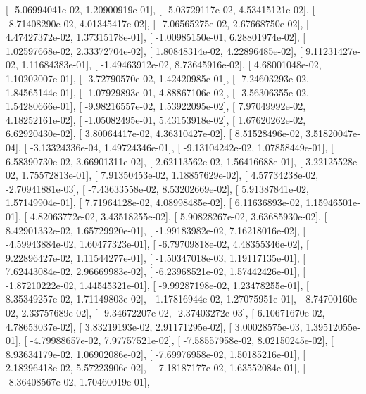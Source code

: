 \documentclass{article}
\begin{document}
       [ -5.06994041e-02,   1.20900919e-01],
       [ -5.03729117e-02,   4.53415121e-02],
       [ -8.71408290e-02,   4.01345417e-02],
       [ -7.06565275e-02,   2.67668750e-02],
       [  4.47427372e-02,   1.37315178e-01],
       [ -1.00985150e-01,   6.28801974e-02],
       [  1.02597668e-02,   2.33372704e-02],
       [  1.80848314e-02,   4.22896485e-02],
       [  9.11231427e-02,   1.11684383e-01],
       [ -1.49463912e-02,   8.73645916e-02],
       [  4.68001048e-02,   1.10202007e-01],
       [ -3.72790570e-02,   1.42420985e-01],
       [ -7.24603293e-02,   1.84565144e-01],
       [ -1.07929893e-01,   4.88867106e-02],
       [ -3.56306355e-02,   1.54280666e-01],
       [ -9.98216557e-02,   1.53922095e-02],
       [  7.97049992e-02,   4.18252161e-02],
       [ -1.05082495e-01,   5.43153918e-02],
       [  1.67620262e-02,   6.62920430e-02],
       [  3.80064417e-02,   4.36310427e-02],
       [  8.51528496e-02,   3.51820047e-04],
       [ -3.13324336e-04,   1.49724346e-01],
       [ -9.13104242e-02,   1.07858449e-01],
       [  6.58390730e-02,   3.66901311e-02],
       [  2.62113562e-02,   1.56416688e-01],
       [  3.22125528e-02,   1.75572813e-01],
       [  7.91350453e-02,   1.18857629e-02],
       [  4.57734238e-02,  -2.70941881e-03],
       [ -7.43633558e-02,   8.53202669e-02],
       [  5.91387841e-02,   1.57149904e-01],
       [  7.71964128e-02,   4.08998485e-02],
       [  6.11636893e-02,   1.15946501e-01],
       [  4.82063772e-02,   3.43518255e-02],
       [  5.90828267e-02,   3.63685930e-02],
       [  8.42901332e-02,   1.65729920e-01],
       [ -1.99183982e-02,   7.16218016e-02],
       [ -4.59943884e-02,   1.60477323e-01],
       [ -6.79709818e-02,   4.48355346e-02],
       [  9.22896427e-02,   1.11544277e-01],
       [ -1.50347018e-03,   1.19117135e-01],
       [  7.62443084e-02,   2.96669983e-02],
       [ -6.23968521e-02,   1.57442426e-01],
       [ -1.87210222e-02,   1.44545321e-01],
       [ -9.99287198e-02,   1.23478255e-01],
       [  8.35349257e-02,   1.71149803e-02],
       [  1.17816944e-02,   1.27075951e-01],
       [  8.74700160e-02,   2.33757689e-02],
       [ -9.34672207e-02,  -2.37403272e-03],
       [  6.10671670e-02,   4.78653037e-02],
       [  3.83219193e-02,   2.91171295e-02],
       [  3.00028575e-03,   1.39512055e-01],
       [ -4.79988657e-02,   7.97757521e-02],
       [ -7.58557958e-02,   8.02150245e-02],
       [  8.93634179e-02,   1.06902086e-02],
       [ -7.69976958e-02,   1.50185216e-01],
       [  2.18296418e-02,   5.57223906e-02],
       [ -7.18187177e-02,   1.63552084e-01],
       [ -8.36408567e-02,   1.70460019e-01],
\end{document}
